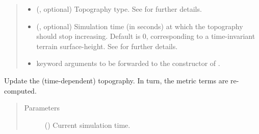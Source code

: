 \documentclass[letterpaper,10pt,english]{sphinxmanual}
\begin{document}
\begin{fulllineitems}
\begin{fulllineitems}
\begin{quote}
\begin{description}
\begin{itemize}
\item {} 
 (, optional) \textendash{} Topography type. See {\hyperref[\detokenize{api:module-grids.topography}]{}}
for further details.

\item {} 
 (, optional) \textendash{} Simulation time (in seconds) at which the topography
should stop increasing. Default is 0, corresponding to a time-invariant terrain
surface-height. See {\hyperref[\detokenize{api:module-grids.topography}]{}} for further details.

\item {} 
 \textendash{} keyword arguments to be forwarded to the constructor of
{\hyperref[\detokenize{api:grids.topography.Topography2d}]{}}.

\end{itemize}

\end{description}\end{quote}

\end{fulllineitems}


\begin{fulllineitems}
\label{\detokenize{api:grids.sigma.Sigma3d.update_topography}}
Update the (time-dependent) topography. In turn, the metric terms are re-computed.
\begin{quote}\begin{description}
\item[{Parameters}] \leavevmode
{} () \textendash{} Current simulation time.

\end{description}\end{quote}

\end{fulllineitems}


\end{fulllineitems}

\end{document}
